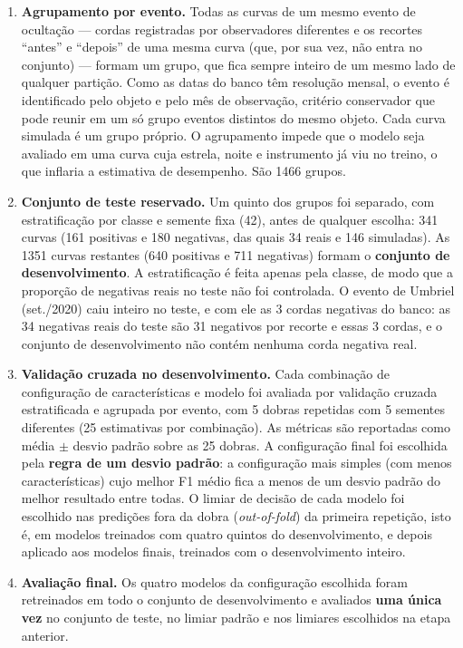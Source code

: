 \begin{enumerate}
	\item \textbf{Agrupamento por evento.} Todas as curvas de um mesmo evento de ocultação --- cordas registradas por observadores diferentes e os recortes ``antes'' e ``depois'' de uma mesma curva (que, por sua vez, não entra no conjunto) --- formam um grupo, que fica sempre inteiro de um mesmo lado de qualquer partição. Como as datas do banco têm resolução mensal, o evento é identificado pelo objeto e pelo mês de observação, critério conservador que pode reunir em um só grupo eventos distintos do mesmo objeto. Cada curva simulada é um grupo próprio. O agrupamento impede que o modelo seja avaliado em uma curva cuja estrela, noite e instrumento já viu no treino, o que inflaria a estimativa de desempenho. São 1466 grupos.
	\item \textbf{Conjunto de teste reservado.} Um quinto dos grupos foi separado, com estratificação por classe e semente fixa (42), antes de qualquer escolha: 341 curvas (161 positivas e 180 negativas, das quais 34 reais e 146 simuladas). As 1351 curvas restantes (640 positivas e 711 negativas) formam o \textbf{conjunto de desenvolvimento}. A estratificação é feita apenas pela classe, de modo que a proporção de negativas reais no teste não foi controlada. O evento de Umbriel (set./2020) caiu inteiro no teste, e com ele as 3 cordas negativas do banco: as 34 negativas reais do teste são 31 negativos por recorte e essas 3 cordas, e o conjunto de desenvolvimento não contém nenhuma corda negativa real.
	\item \textbf{Validação cruzada no desenvolvimento.} Cada combinação de configuração de características e modelo foi avaliada por validação cruzada estratificada e agrupada por evento, com 5 dobras repetidas com 5 sementes diferentes (25 estimativas por combinação). As métricas são reportadas como média $\pm$ desvio padrão sobre as 25 dobras. A configuração final foi escolhida pela \textbf{regra de um desvio padrão}: a configuração mais simples (com menos características) cujo melhor F1 médio fica a menos de um desvio padrão do melhor resultado entre todas. O limiar de decisão de cada modelo foi escolhido nas predições fora da dobra (\textit{out-of-fold}) da primeira repetição, isto é, em modelos treinados com quatro quintos do desenvolvimento, e depois aplicado aos modelos finais, treinados com o desenvolvimento inteiro.
	\item \textbf{Avaliação final.} Os quatro modelos da configuração escolhida foram retreinados em todo o conjunto de desenvolvimento e avaliados \textbf{uma única vez} no conjunto de teste, no limiar padrão e nos limiares escolhidos na etapa anterior.
\end{enumerate}

